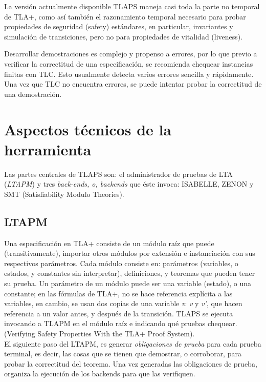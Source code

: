 \documentclass[spanish]{llncs}
\begin{document}
  La versión actualmente disponible TLAPS maneja casi toda la parte no temporal de TLA+, como así también el razonamiento temporal necesario para probar propiedades de 
  seguridad (safety) estándares, en particular, invariantes y simulación de transiciones, pero no para propiedades de vitalidad (liveness).
  
  Desarrollar demostraciones es complejo y propenso a errores, por lo que previo a verificar la correctitud de una especificación,
  se recomienda chequear instancias finitas con TLC. Esto usualmente detecta varios errores sencilla y rápidamente. 
  Una vez que TLC no encuentra errores, se puede intentar probar la correctitud de una demostración. 


\section{Aspectos técnicos de la herramienta}

Las partes centrales de TLAPS son: el administrador de pruebas de LTA (\textit{LTAPM}) y tres \textit{back-ends, o, backends} que éste invoca: ISABELLE, ZENON y SMT (Satisfiability Modulo Theories).

  \subsection{LTAPM}
  
  Una especificación en TLA+ consiste de un módulo raíz que puede (transitivamente), importar otros módulos por extensión e instanciación con
  sus respectivos parámetros. Cada módulo consiste en: parámetros (variables, o estados, y constantes sin interpretar), definiciones,
  y teoremas que pueden tener su prueba. Un parámetro de un módulo puede ser una variable (estado), o una constante; en las fórmulas de TLA+, no se hace referencia explícita
  a las variables, en cambio, se usan dos copias de una variable \textit{v}: \textit{v} y \textit{v'}, que hacen referencia a un valor antes, y después de la transición. 
  TLAPS se ejecuta invocando a TLAPM en el módulo raíz e indicando qué pruebas chequear. (Verifying Safety Properties With the TLA+ Proof System).
  \\
  
  El siguiente paso del LTAPM, es generar \textit{obligaciones de prueba} para cada prueba terminal, es decir, las cosas que se tienen que demostrar, o corroborar, para
  probar la correctitud del teorema. Una vez generadas las obligaciones de prueba, organiza la ejecución de los backends para que las verifiquen.
  \\
  
\end{document}
